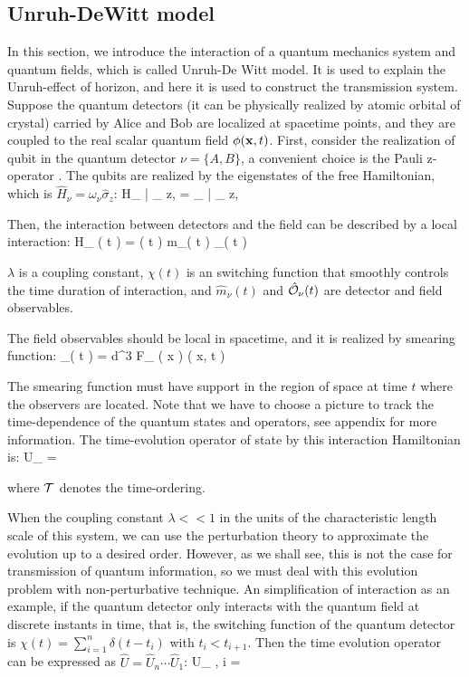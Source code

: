 \documentclass[a4paper,12pt]{article}
\begin{document}
\subsection*{Unruh-DeWitt model}
In this section, we introduce the interaction of a quantum mechanics system and quantum fields, which is called Unruh-De Witt model.
It is used to explain the Unruh-effect of horizon, and here it is used to construct the transmission system.
Suppose the quantum detectors (it can be physically realized by atomic orbital of crystal) carried by Alice and Bob are localized at spacetime points, and they are coupled to the real scalar quantum field $\phi( \mathbf x, t )$.
First, consider the realization of qubit in the quantum detector $ \nu = \{A, B\} $, a convenient choice is the Pauli z-operator \cite{PhysRevD.101.036014}.
The qubits are realized by the eigenstates of the free Hamiltonian, which is $ \hat H_{ \nu } = \omega_\nu \hat \sigma_z $:
\be
    \hat H_{ \nu } | \pm_{ z, \nu } \ar = \pm \omega_{ \nu } | \pm_{ z, \nu } \ar
\ee

Then, the interaction between detectors and the field can be described by a local interaction:
\be
    \hat H_{ \nu }( t ) = \lambda \chi( t ) \hat m_\nu( t ) \otimes {}_\nu ( t )
\ee

$ \lambda $ is a coupling constant, $\chi ( t )$ is an switching function that smoothly controls the time duration of interaction, and $\hat m_\nu( t )$ and $\hat{ \mathcal{ O } }_\nu ( t )$ are detector and field observables.

The field observables should be local in spacetime, and it is realized by smearing function:
\be
    _\nu ( t ) = \int{} d^{3}  F_{ \nu } ( \mb x )  ( \mb x, t )
\ee

The smearing function must have support in the region of space at time $t$ where the observers are located.
Note that we have to choose a picture to track the time-dependence of the quantum states and operators, see appendix for more information.
The time-evolution operator of state by this interaction Hamiltonian is:
\be
    \hat U_{ \nu } =  \exp {}
\ee

where $ \mathcal{ T } $ denotes the time-ordering. 

When the coupling constant $\lambda << 1$ in the units of the characteristic length scale of this system, we can use the perturbation theory to approximate the evolution up to a desired order.
However, as we shall see, this is not the case for transmission of quantum information, so we must deal with this evolution problem with non-perturbative technique.
An simplification of interaction as an example, if the quantum detector only interacts with the quantum field at discrete instants in time, that is, the switching function of the quantum detector is $ \chi ( t ) = \sum_{ i = 1 }^{ n } \delta ( t - t_i )$ with $ t_i < t_{ i + 1 } $.
Then the time evolution operator can be expressed as $ \hat U = \hat U_n \cdots \hat U_1 $:
\be
    \hat U_{ \nu, i } = \exp {}
\ee
\end{document}
